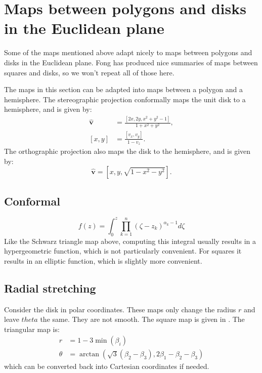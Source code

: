 \documentclass{amsart}[12pt]
\begin{document}
\appendix
\section{Maps between polygons and disks in the Euclidean plane}
Some of the maps mentioned above adapt nicely to maps between polygons and disks
in the Euclidean plane. Fong \cite{fong15}\cite{fong16} has produced nice
summaries of maps between squares and disks, so we won't repeat all of those
here.

The maps in this section can be adapted into maps between a polygon and a
hemisphere. The stereographic projection conformally maps the unit disk to a
hemisphere, and is given by:
\begin{equation}\begin{split}
  \hat{\mathbf v} &= \frac{[2x, 2y, x^2+y^2-1]}{1+x^2+y^2}, \\
  [x, y] & = \frac{[v_x, v_y]}{1-v_z}.
\end{split}\end{equation}
The orthographic projection also maps the disk to the hemisphere,
and is given by:
\begin{equation}
  \hat{\mathbf v} = [x, y, \sqrt{1-x^2-y^2}].
\end{equation}
\subsection{Conformal}
\begin{equation}
f(z) = \int_0^z \prod_{k=1}^n (\zeta - z_k)^{\alpha_k-1} d\zeta
\end{equation}
 Like the Schwarz triangle map above,
computing this integral usually results in a hypergeometric function,
which is not particularly convenient. For squares it results in an elliptic
function, which is slightly more convenient.\cite{fong16}

\subsection{Radial stretching}
Consider the disk in polar coordinates. These maps only change the radius $r$
and leave $theta$ the same. They are not smooth. The square map is given in
\cite{fong15}. The triangular map is:
\begin{equation}\begin{split}
  r &= 1-3 \min( \beta_i ) \\
  \theta &= \arctan(\sqrt{3}(\beta_2-\beta_3),
  2\beta_1 - \beta_2 - \beta_3)
\end{split}\end{equation}
which can be converted back into Cartesian coordinates if needed.
\end{document}
